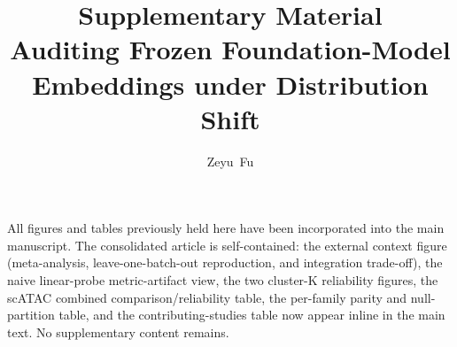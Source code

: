 \documentclass[journal]{IEEEtran}
\begin{document}
\title{Supplementary Material\\ \large Auditing Frozen Foundation-Model Embeddings under Distribution Shift}
\author{Zeyu~Fu}
\maketitle

\noindent All figures and tables previously held here have been incorporated into the main
manuscript. The consolidated article is self-contained: the external context figure
(meta-analysis, leave-one-batch-out reproduction, and integration trade-off), the naive
linear-probe metric-artifact view, the two cluster-K reliability figures, the scATAC combined
comparison/reliability table, the per-family parity and null-partition table, and the
contributing-studies table now appear inline in the main text. No supplementary content remains.
\end{document}
